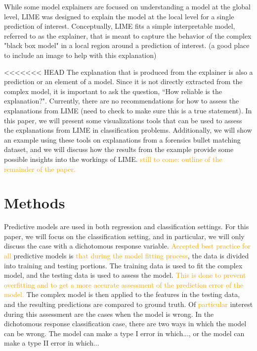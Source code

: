 \documentclass[AMS,STIX2COL]{WileyNJD-v2}
\newcommand{\hh}[1]{\textcolor{orange}{#1}}
\begin{document}
While some model explainers are focused on understanding a model at the global level, LIME was designed to explain the model at the local level for a single prediction of interest. Conceptually, LIME fits a simple interpretable model, referred to as the explainer, that is meant to capture the behavior of the complex "black box model" in a local region around a prediction of interest. (a good place to include an image to help with this explanation)

<<<<<<< HEAD
The explanation that is produced from the explainer is also a prediction or an element of a model. Since it is not directly extracted from the complex model, it is important to ask the question, ``How reliable is the explanation?". Currently, there are no recommendations for how to assess the explanations from LIME (need to check to make sure this is a true statement). In this paper, we will present some visualizations tools that can be used to assess the explanations from LIME in classification problems. Additionally, we will show an example using these tools on explanations from a forensics bullet matching dataset, and we will discuss how the results from the example provide some possible insights into the workings of LIME.
\hh{still to come: outline of the remainder of the paper.}


\section{Methods}

Predictive models are used in both regression and classification settings. For this paper, we will focus on the classification setting, and in particular, we will only discuss the case with a dichotomous response variable. \hh{Accepted best practice for all}  predictive models is \hh{that during the model fitting process}, the data is divided into training and testing portions. The training data is used to fit the complex model, and the testing data is used to assess the model. \hh{This is done to prevent overfitting and to get a more accurate assessment of the prediction error of the model.} The complex model is then applied to the features in the testing data, and the resulting predictions are compared to ground truth. Of \hh{particular} interest during this assessment are the cases when the model is wrong. In the dichotomous response classification case, there are two ways in which the model can be wrong. The model can make a type I error in which..., or the model can make a type II error in which...
\end{document}
